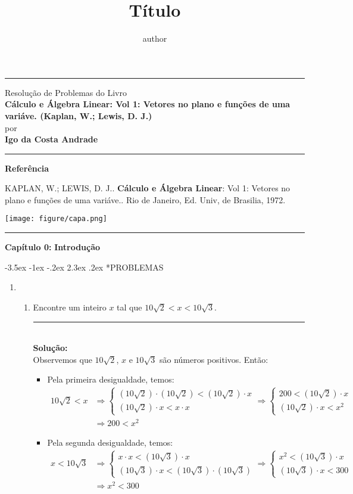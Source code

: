 \documentclass[twoside]{article}
\title{Título}
\author{author}
\makeatletter
\renewcommand\section{\@startsection{section}{1}{\z@}%
                                     {-3.5ex \@plus -1ex \@minus -.2ex}%
                                     {2.3ex \@plus.2ex}%
                                     {\normalfont\large\bfseries}}
\newcommand{\iniSol}{
    \noindent\textcolor{mainColor}{\rule{0.3\textwidth}{0.4pt}}\\
    \noindent\textcolor{mainColor}{\textbf{Solução:}}\\
}
\newcommand{\makeheader}{
  \textcolor{mainColor}{\hrule}
  \vspace{0.25cm}
  \begin{minipage}[c]{12cm}
    \begin{center}
      Resolução de Problemas do Livro\\
      \vspace{0.25cm}
      \textcolor{mainColor}{\large{\textbf{Cálculo e Álgebra Linear: Vol 1: Vetores no plano e funções de uma variáve. (Kaplan, W.; Lewis, D. J.)}}}\\
      \vspace{0.7cm}
      \small{por}\\
      \vspace{0.2cm}
      \textbf{\large{Igo da Costa Andrade}}
    \end{center}
    \vspace{0.25cm}
    \hrule
    \vspace{0.25cm}
    \textbf{Referência}
  
    \uppercase{Kaplan, W.; Lewis, D. J.}. \textbf{Cálculo e Álgebra Linear}: Vol 1: Vetores no plano e funções de uma variáve.. Rio de Janeiro, Ed. Univ, de Brasilia, 1972.
  \end{minipage}
  \begin{minipage}[c]{4cm}
    \begin{flushright}
      \texttt{[image: figure/capa.png]}    
    \end{flushright}
  \end{minipage}
  \vspace{0.25cm}
  \textcolor{mainColor}{\hrule}
  
  \begin{center}
    \vspace{0.5cm}
        \large{\textbf{Capítulo 0: }}
            \large{\textbf{Introdução}}
        \vspace{0.5cm}
  \end{center}
}
\makeatother
\begin{document}
\thispagestyle{empty}

\makeheader


\section*{PROBLEMAS}

\begin{enumerate}
  \item 
  \begin{enumerate}[label=(\alph*)]
    \item Encontre um inteiro $x$ tal que $10 \sqrt{2} < x < 10\sqrt{3}$.\\
    \iniSol
      Observemos que $10\sqrt{2}$, $x$ e $10\sqrt{3}$ são números positivos. Então:
      \begin{itemize} 
      \item Pela primeira desigualdade, temos:
      \begin{align*}
      10\sqrt{2} < x &\Rightarrow
      \begin{cases}
        (10\sqrt{2})\cdot (10\sqrt{2}) < (10\sqrt{2}) \cdot x\\
        (10\sqrt{2})\cdot x < x\cdot x
      \end{cases}
      \Rightarrow
      \begin{cases}
        200 < (10\sqrt{2}) \cdot x\\
        (10\sqrt{2}) \cdot x < x^2
      \end{cases}
      \\
      &\Rightarrow 200 < x^2
      \end{align*}
      \item Pela segunda desigualdade, temos:
      \begin{align*}
        x < 10 \sqrt{3} & \Rightarrow
        \begin{cases}
          x \cdot x < (10\sqrt{3}) \cdot x \\
          (10\sqrt{3}) \cdot x < (10\sqrt{3}) \cdot (10 \sqrt{3})
        \end{cases}
        \Rightarrow
        \begin{cases}
          x^2 < (10\sqrt{3}) \cdot x\\
          (10\sqrt{3}) \cdot x < 300
        \end{cases}
        \\
        &\Rightarrow x^2 < 300
      \end{align*}
      \end{itemize}

\end{enumerate}
\end{enumerate}
\end{document}
